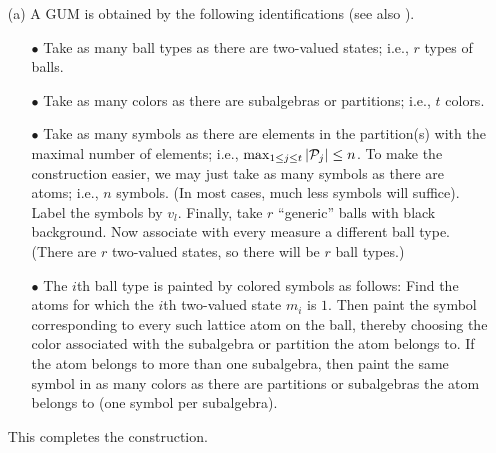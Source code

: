 \begin{itemize}
\begin{itemize}
\item[(a)] A GUM is obtained by the following identifications
(see also \cite[p. 271]{wright:pent}).
\begin{itemize}
\item[$\bullet$]
Take as many ball types as there are two-valued states; i.e.,
$r$ types of balls.
\item[$\bullet$]
Take as many colors as there are subalgebras or partitions; i.e., $t$ colors.
\item[$\bullet$]
Take as many symbols as there are elements in the partition(s) with the maximal number of elements;
i.e., $\max_{1\le j\le t}\vert {\cal P}_j\vert \le n$.
To make the construction easier, we may just take as many symbols as there are atoms; i.e., $n$ symbols.
(In most cases, much less symbols will suffice).
Label the symbols by $v_l$.
Finally, take $r$ ``generic'' balls with black background.
Now associate with every measure a different ball type.
(There are $r$ two-valued states, so there will be $r$ ball types.)
\item[$\bullet$]
The $i$th ball type is painted by colored
symbols  as follows:
Find the atoms  for which the $i$th two-valued state $m_i$ is $1$.
Then paint the symbol corresponding to every such lattice atom on the ball, thereby choosing
the color associated with the subalgebra or partition
the atom belongs to.
If the atom belongs to more than one subalgebra,
then paint the same symbol in as many colors as there are partitions or subalgebras
the atom belongs to (one symbol per subalgebra).
\end{itemize}
This completes the construction.




\end{itemize}
\end{itemize}
